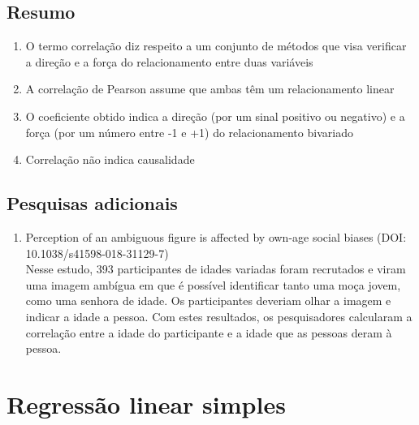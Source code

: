 \documentclass[
]{book}
\providecommand{\tightlist}{%
  \setlength{\itemsep}{0pt}\setlength{\parskip}{0pt}}
\newenvironment{explore}{
  \definecolor{shadecolor}{rgb}{0, 0, 0}  %
  \color{white}
  \begin{shaded}}
 {\end{shaded}}
\begin{document}
\hypertarget{resumo-8}{%
\section{Resumo}\label{resumo-8}}

\begin{explore}

\begin{enumerate}
\def\labelenumi{\arabic{enumi}.}
\tightlist
\item
  O termo correlação diz respeito a um conjunto de métodos que visa verificar a direção e a força do relacionamento entre duas variáveis\\
\item
  A correlação de Pearson assume que ambas têm um relacionamento linear\\
\item
  O coeficiente obtido indica a direção (por um sinal positivo ou negativo) e a força (por um número entre -1 e +1) do relacionamento bivariado\\
\item
  Correlação não indica causalidade\\
\end{enumerate}

\end{explore}

\hypertarget{pesquisas-adicionais-3}{%
\section{Pesquisas adicionais}\label{pesquisas-adicionais-3}}

\begin{enumerate}
\def\labelenumi{\arabic{enumi}.}
\tightlist
\item
  Perception of an ambiguous figure is affected by own-age social biases (DOI: 10.1038/s41598-018-31129-7)\\
  Nesse estudo, 393 participantes de idades variadas foram recrutados e viram uma imagem ambígua em que é possível identificar tanto uma moça jovem, como uma senhora de idade. Os participantes deveriam olhar a imagem e indicar a idade a pessoa. Com estes resultados, os pesquisadores calcularam a correlação entre a idade do participante e a idade que as pessoas deram à pessoa.
\end{enumerate}

\hypertarget{regressuxe3o-linear-simples}{%
\chapter{Regressão linear simples}\label{regressuxe3o-linear-simples}}
\end{document}
